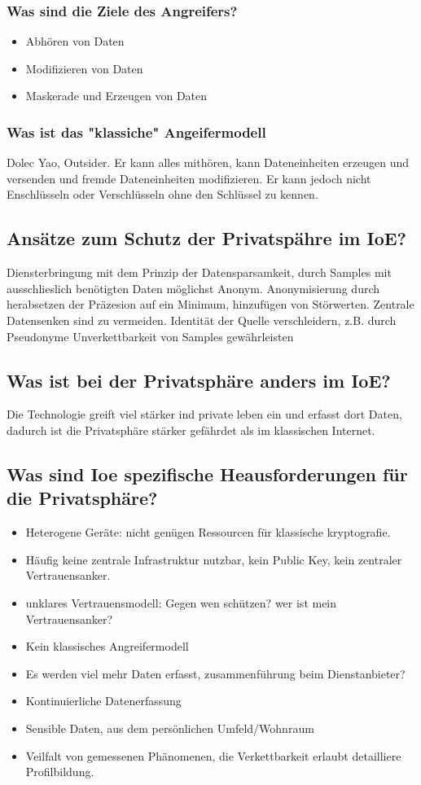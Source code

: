 	\subsubsection{Was sind die Ziele des Angreifers?}
	\begin{itemize}
		\item Abhören von Daten
		\item Modifizieren von Daten
		\item Maskerade und Erzeugen von Daten
	\end{itemize}
	\subsubsection{Was ist das "klassiche" Angeifermodell}
	Dolec\- Yao, Outsider. Er kann alles mithören, kann Dateneinheiten erzeugen und versenden und fremde Dateneinheiten modifizieren. Er kann jedoch nicht Enschlüsseln oder Verschlüsseln ohne den Schlüssel zu kennen.
	
	\subsection{Ansätze zum Schutz der Privatspähre im IoE?}
	Diensterbringung mit dem Prinzip der Datensparsamkeit, durch Samples mit ausschlieslich benötigten Daten möglichst Anonym.
	Anonymisierung durch herabsetzen der Präzesion auf ein Minimum, hinzufügen von Störwerten.
	Zentrale Datensenken sind zu vermeiden. 
	Identität der Quelle verschleidern, z.B. durch Pseudonyme
	Unverkettbarkeit von Samples gewährleisten
	
	\subsection{Was ist bei der Privatsphäre anders im IoE?}
	Die Technologie greift viel stärker ind private leben ein und erfasst dort Daten, dadurch ist die Privatsphäre stärker gefährdet als im klassischen Internet.
	
	\subsection{Was sind Ioe\- spezifische Heausforderungen für die Privatsphäre?}
	\begin{itemize}
		\item Heterogene Geräte: nicht genügen Ressourcen für klassische kryptografie.
		\item Häufig keine zentrale Infrastruktur nutzbar, kein Public Key, kein zentraler Vertrauensanker.
		\item unklares Vertrauensmodell: Gegen wen schützen? wer ist mein Vertrauensanker?
		\item Kein klassisches Angreifermodell
		\item Es werden viel mehr Daten erfasst, zusammenführung beim Dienstanbieter?
		\item Kontinuierliche Datenerfassung
		\item Sensible Daten, aus dem persönlichen Umfeld/Wohnraum
		\item Veilfalt von gemessenen Phänomenen, die Verkettbarkeit erlaubt detailliere Profilbildung.
	\end{itemize}
